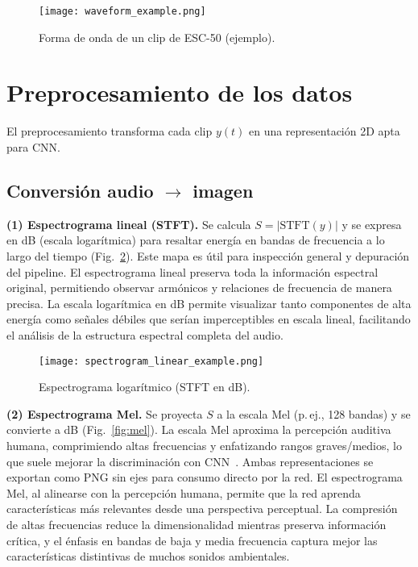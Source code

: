 \documentclass[conference]{IEEEtran}
\begin{document}
\begin{figure}[t]
    \centering
    \texttt{[image: waveform\_example.png]}
    \caption{Forma de onda de un clip de ESC-50 (ejemplo).}
    \label{fig:wave}
\end{figure}

\section{Preprocesamiento de los datos}
\label{sec:prepro}
El preprocesamiento transforma cada clip $y(t)$ en una representación 2D apta para CNN.

\subsection{Conversión audio $\rightarrow$ imagen}
\textbf{(1) Espectrograma lineal (STFT).} Se calcula $S=\lvert\text{STFT}(y)\rvert$ y se expresa en dB (escala logarítmica) para resaltar energía en bandas de frecuencia a lo largo del tiempo (Fig.~\ref{fig:stft}). Este mapa es útil para inspección general y depuración del pipeline. El espectrograma lineal preserva toda la información espectral original, permitiendo observar armónicos y relaciones de frecuencia de manera precisa. La escala logarítmica en dB permite visualizar tanto componentes de alta energía como señales débiles que serían imperceptibles en escala lineal, facilitando el análisis de la estructura espectral completa del audio.

\begin{figure}[t]
    \centering
    \texttt{[image: spectrogram\_linear\_example.png]}
    \caption{Espectrograma logarítmico (STFT en dB).}
    \label{fig:stft}
\end{figure}

\textbf{(2) Espectrograma Mel.} Se proyecta $S$ a la escala Mel (p.\,ej., 128 bandas) y se convierte a dB (Fig.~\ref{fig:mel}). La escala Mel aproxima la percepción auditiva humana, comprimiendo altas frecuencias y enfatizando rangos graves/medios, lo que suele mejorar la discriminación con CNN~\cite{stevens1937scale}. Ambas representaciones se exportan como PNG sin ejes para consumo directo por la red. El espectrograma Mel, al alinearse con la percepción humana, permite que la red aprenda características más relevantes desde una perspectiva perceptual. La compresión de altas frecuencias reduce la dimensionalidad mientras preserva información crítica, y el énfasis en bandas de baja y media frecuencia captura mejor las características distintivas de muchos sonidos ambientales.
\end{document}

